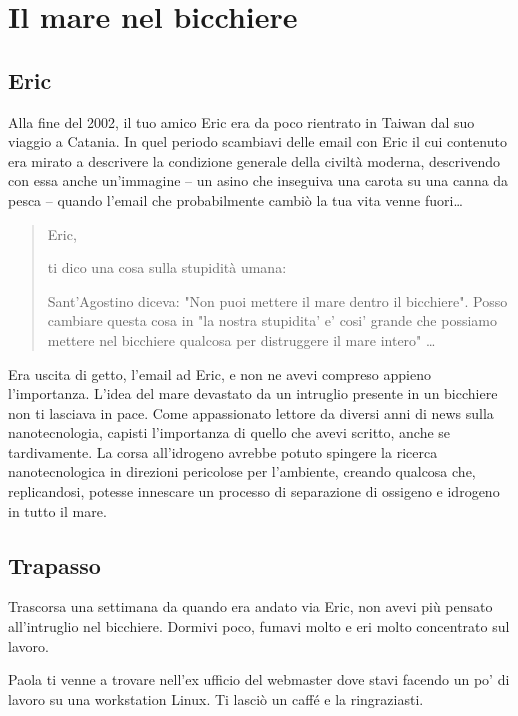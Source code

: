 \chapter{Il mare nel bicchiere}
\label{il_mare_nel_bicchiere} %

\section{Eric}
\label{defs}

Alla fine del 2002, il tuo amico Eric era da poco rientrato in Taiwan dal suo viaggio a Catania. In quel periodo scambiavi delle email con Eric il cui contenuto era mirato a descrivere la condizione generale della civiltà moderna, descrivendo con essa anche un'immagine -- un asino che inseguiva una carota su una canna da pesca -- quando l'email che probabilmente cambiò la tua vita venne fuori\ldots

\begin{quote}
{\ttfamily\small
Eric,

ti dico una cosa sulla stupidità umana:

Sant'Agostino diceva: "Non puoi mettere il mare dentro il bicchiere". Posso cambiare questa cosa in "la nostra stupidita' e' cosi' grande che possiamo mettere nel bicchiere qualcosa per distruggere il mare intero" \ldots
}
\end{quote}

Era uscita di getto, l'email ad Eric, e non ne avevi compreso appieno l'importanza. L'idea del mare devastato da un intruglio presente in un bicchiere non ti lasciava in pace. Come appassionato lettore da diversi anni di news sulla nanotecnologia, capisti l'importanza di quello che avevi scritto, anche se tardivamente. La corsa all'idrogeno avrebbe potuto spingere la ricerca nanotecnologica in direzioni pericolose per l'ambiente, creando qualcosa che, replicandosi, potesse innescare un processo di separazione di ossigeno e idrogeno in tutto il mare.

\section{Trapasso}
\label{trapasso}

Trascorsa una settimana da quando era andato via Eric, non avevi più pensato all'intruglio nel bicchiere. Dormivi poco, fumavi molto e eri molto concentrato sul lavoro.

Paola ti venne a trovare nell'ex ufficio del webmaster dove stavi facendo un po' di lavoro su una workstation Linux. Ti lasciò un caffé e la ringraziasti.

